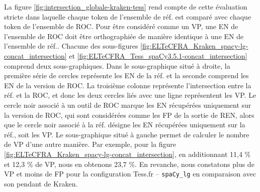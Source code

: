 La figure \ref{fig:intersection_globale-kraken-tess} rend compte de cette évaluation stricte dans laquelle chaque token de l'ensemble de réf. est comparé avec chaque token de l'ensemble de ROC. Pour être considéré comme un VP, une EN de l'ensemble de ROC doit être orthographiée de manière identique à une EN de l'ensemble de réf.. Chacune des sous-figures \ref{fig:ELTeCFRA_Kraken_spacy-lg-concat_intersection} et \ref{fig:ELTeCFRA_Tess_spaCy3.5.1-concat_intersection} comprend deux sous-graphiques. Dans le sous-graphique situé à droite, la première série de cercles représente les EN de la réf. et la seconde comprend les EN de la version de ROC. La troisième colonne représente l'intersection entre la réf. et la ROC, et donc les deux cercles liés avec une ligne représentent les VP. Le cercle noir associé à un outil de ROC marque les EN récupérées uniquement sur la version de ROC, qui sont considérées comme les FP de la sortie de REN, alors que le cercle noir associé à la réf. désigne les EN récupérées uniquement sur la réf., soit les VP. Le sous-graphique situé à gauche permet de calculer le nombre de VP d'une autre manière. Par exemple, pour la figure \ref{fig:ELTeCFRA_Kraken_spacy-lg-concat_intersection}, en additionnant 11,4 \% et 12,3 \% de VP, nous en obtenons 23,7 \%.
En revanche, nous constatons plus de VP et moins de FP pour la configuration Tess.fr -- \texttt{spaCy\_lg} en comparaison avec son pendant de Kraken.

